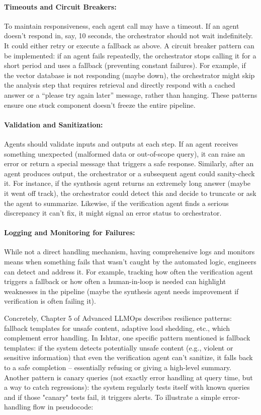 \paragraph*{Timeouts and Circuit Breakers:}
To maintain responsiveness, each agent call may have a timeout. If an agent doesn’t respond in, say, 10 seconds, the orchestrator should not wait indefinitely. It could either retry or execute a fallback as above. A circuit breaker pattern can be implemented: if an agent fails repeatedly, the orchestrator stops calling it for a short period and uses a fallback (preventing constant failures). For example, if the vector database is not responding (maybe down), the orchestrator might skip the analysis step that requires retrieval and directly respond with a cached answer or a “please try again later” message, rather than hanging. These patterns ensure one stuck component doesn’t freeze the entire pipeline.

\paragraph*{Validation and Sanitization:}
Agents should validate inputs and outputs at each step. If an agent receives something unexpected (malformed data or out-of-scope query), it can raise an error or return a special message that triggers a safe response. Similarly, after an agent produces output, the orchestrator or a subsequent agent could sanity-check it. For instance, if the synthesis agent returns an extremely long answer (maybe it went off track), the orchestrator could detect this and decide to truncate or ask the agent to summarize. Likewise, if the verification agent finds a serious discrepancy it can’t fix, it might signal an error status to orchestrator.

\paragraph*{Logging and Monitoring for Failures:}
While not a direct handling mechanism, having comprehensive logs and monitors means when something fails that wasn't caught by the automated logic, engineers can detect and address it. For example, tracking how often the verification agent triggers a fallback or how often a human-in-loop is needed can highlight weaknesses in the pipeline (maybe the synthesis agent needs improvement if verification is often failing it).

Concretely, Chapter 5 of Advanced LLMOps describes resilience patterns: fallback templates for unsafe content, adaptive load shedding, etc., which complement error handling. In Ishtar, one specific pattern mentioned is fallback templates: if the system detects potentially unsafe content (e.g., violent or sensitive information) that even the verification agent can't sanitize, it falls back to a safe completion – essentially refusing or giving a high-level summary. Another pattern is canary queries (not exactly error handling at query time, but a way to catch regressions): the system regularly tests itself with known queries and if those "canary" tests fail, it triggers alerts. To illustrate a simple error-handling flow in pseudocode:

